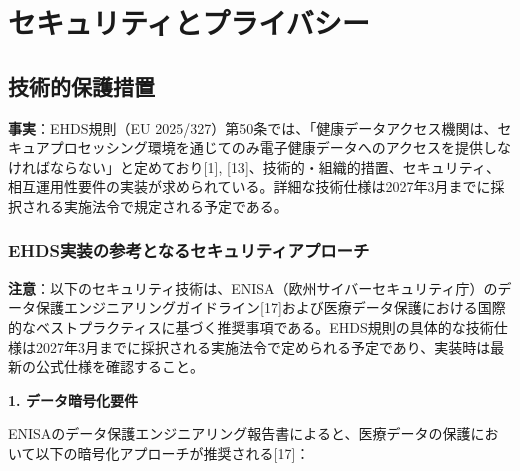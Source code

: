 \documentclass[
  a4paper,
  a4paper,
  11pt]{ltjsbook}
\begin{document}
\section{セキュリティとプライバシー}\label{ux30bbux30adux30e5ux30eaux30c6ux30a3ux3068ux30d7ux30e9ux30a4ux30d0ux30b7ux30fc}

\subsection{技術的保護措置}\label{ux6280ux8853ux7684ux4fddux8b77ux63aaux7f6e}

\textbf{事実}：EHDS規則（EU
2025/327）第50条では、「健康データアクセス機関は、セキュアプロセッシング環境を通じてのみ電子健康データへのアクセスを提供しなければならない」と定めており{[}1{]},
{[}13{]}、技術的・組織的措置、セキュリティ、相互運用性要件の実装が求められている。詳細な技術仕様は2027年3月までに採択される実施法令で規定される予定である。

\subsubsection{EHDS実装の参考となるセキュリティアプローチ}\label{ehdsux5b9fux88c5ux306eux53c2ux8003ux3068ux306aux308bux30bbux30adux30e5ux30eaux30c6ux30a3ux30a2ux30d7ux30edux30fcux30c1}

\begin{tcolorbox}[enhanced jigsaw, toprule=.15mm, bottomtitle=1mm, coltitle=black, left=2mm, opacityback=0, arc=.35mm, colbacktitle=quarto-callout-warning-color!10!white, colback=white, opacitybacktitle=0.6, bottomrule=.15mm, rightrule=.15mm, breakable, title=\textcolor{quarto-callout-warning-color}{\faExclamationTriangle}\hspace{0.5em}{Warning}, toptitle=1mm, titlerule=0mm, colframe=quarto-callout-warning-color-frame, leftrule=.75mm]

\textbf{注意}：以下のセキュリティ技術は、ENISA（欧州サイバーセキュリティ庁）のデータ保護エンジニアリングガイドライン{[}17{]}および医療データ保護における国際的なベストプラクティスに基づく推奨事項である。EHDS規則の具体的な技術仕様は2027年3月までに採択される実施法令で定められる予定であり、実装時は最新の公式仕様を確認すること。

\end{tcolorbox}

\textbf{1. データ暗号化要件}

ENISAのデータ保護エンジニアリング報告書によると、医療データの保護において以下の暗号化アプローチが推奨される{[}17{]}：
\end{document}
